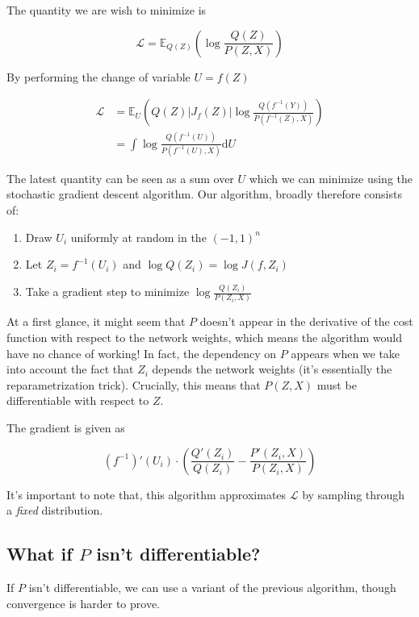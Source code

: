 \documentclass{article}
\begin{document}
The quantity we are wish to minimize is

\[
  \mathcal{L} = \mathbb{E}_{Q(Z)} \left(\log \frac{Q(Z)}{P(Z,X)} \right)
\]

By performing the change of variable $U = f(Z)$

\[
  \begin{aligned}
    \mathcal{L} &= \mathbb{E}_{U} \left(Q(Z)|J_{f}(Z)|\log \frac{Q(f^{-1}(Y))}{P(f^{-1}(Z),X)}\right)\\
                &= \int \log \frac{Q(f^{-1}(U))}{P(f^{-1}(U),X)} \mathrm{d}U
  \end{aligned}
\]

The latest quantity can be seen as a sum over $U$ which we can minimize using
the stochastic gradient descent algorithm. Our algorithm, broadly therefore
consists of:

\begin{enumerate}
\item Draw \(U_i\) uniformly at random in the \((-1,1)^n\)
\item Let \(Z_i = f^{-1}(U_i)\) and \(\log Q(Z_i) = \log J(f, Z_i)\)
\item Take a gradient step to minimize \(\log \frac{Q(Z_i)}{P(Z_i,X)}\)
\end{enumerate}

At a first glance, it might seem that \(P\) doesn't appear in the derivative
of the cost function with respect to the network weights, which means the
algorithm would have no chance of working! In fact, the dependency on
\(P\) appears when we take into account the fact that \(Z_i\) depends the
network weights (it's essentially the reparametrization trick).
Crucially, this means that \(P(Z,X)\) must be differentiable with respect to
\(Z\).

The gradient is given as

\[
  (f^{-1})'(U_i)\cdot\left(\frac{Q'(Z_i)}{Q(Z_i)} - \frac{P'(Z_i, X)}{P(Z_i, X)}\right)
\]

It's important to note that, this algorithm approximates \(\mathcal{L}\) by
sampling through a \emph{fixed} distribution.

\subsection{What if \(P\) isn't differentiable?}

If \(P\) isn't differentiable, we can use a variant of the previous algorithm,
though convergence is harder to prove.
\end{document}
